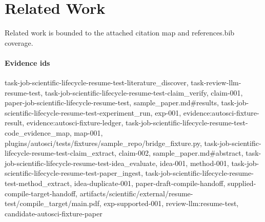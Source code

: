 \section{Related Work}
Related work is bounded to the attached citation map and references.bib coverage.

\paragraph{Evidence ids} task-job-scientific-lifecycle-resume-test-literature\_discover, task-review-llm-resume-test, task-job-scientific-lifecycle-resume-test-claim\_verify, claim-001, paper-job-scientific-lifecycle-resume-test, sample\_paper.md\#results, task-job-scientific-lifecycle-resume-test-experiment\_run, exp-001, evidence:autosci-fixture-result, evidence:autosci-fixture-ledger, task-job-scientific-lifecycle-resume-test-code\_evidence\_map, map-001, plugins/autosci/tests/fixtures/sample\_repo/bridge\_fixture.py, task-job-scientific-lifecycle-resume-test-claim\_extract, claim-002, sample\_paper.md\#abstract, task-job-scientific-lifecycle-resume-test-idea\_evaluate, idea-001, method-001, task-job-scientific-lifecycle-resume-test-paper\_ingest, task-job-scientific-lifecycle-resume-test-method\_extract, idea-duplicate-001, paper-draft-compile-handoff, supplied-compile-target-handoff, artifacts/scientific/external/resume-test/compile\_target/main.pdf, exp-supported-001, review-llm:resume-test, candidate-autosci-fixture-paper
